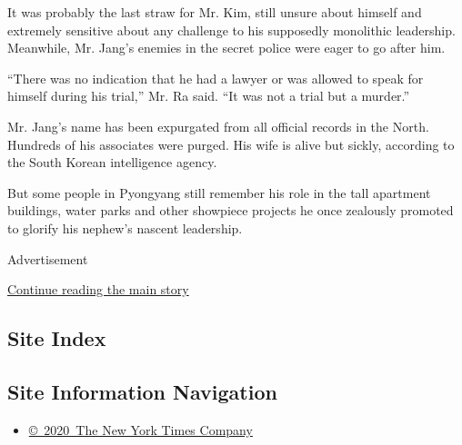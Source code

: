 It was probably the last straw for Mr. Kim, still unsure about himself
and extremely sensitive about any challenge to his supposedly monolithic
leadership. Meanwhile, Mr. Jang's enemies in the secret police were
eager to go after him.

``There was no indication that he had a lawyer or was allowed to speak
for himself during his trial,'' Mr. Ra said. ``It was not a trial but a
murder.''

Mr. Jang's name has been expurgated from all official records in the
North. Hundreds of his associates were purged. His wife is alive but
sickly, according to the South Korean intelligence agency.

But some people in Pyongyang still remember his role in the tall
apartment buildings, water parks and other showpiece projects he once
zealously promoted to glorify his nephew's nascent leadership.

Advertisement

\protect\hyperlink{after-bottom}{Continue reading the main story}

\hypertarget{site-index}{%
\subsection{Site Index}\label{site-index}}

\hypertarget{site-information-navigation}{%
\subsection{Site Information
Navigation}\label{site-information-navigation}}

\begin{itemize}
\tightlist
\item
  \href{https://help.nytimes.com/hc/en-us/articles/115014792127-Copyright-notice}{©~2020~The
  New York Times Company}
\end{itemize}

